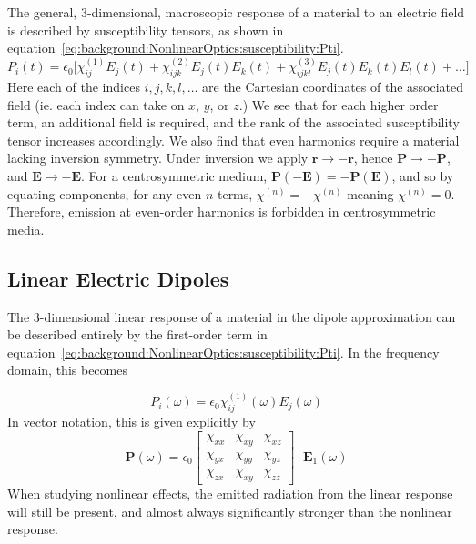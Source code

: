 The general, 3-dimensional, macroscopic response of a material to an electric field is described by susceptibility tensors, as shown in equation~\ref{eq:background:NonlinearOptics:susceptibility:Pti}.
\begin{equation}\label{eq:background:NonlinearOptics:susceptibility:Pti}
	P_{i}(t) =  \epsilon_{0}\big[
				\chi^{(1)}_{ij}  E_{j}(t) +
				\chi^{(2)}_{ijk}  E_{j}(t) E_{k}(t) +
				\chi^{(3)}_{ijkl}  E_{j}(t) E_{k}(t) E_{l}(t)+ \ldots
				\big]
\end{equation}
Here each of the indices $i,j,k,l,\ldots$ are the Cartesian coordinates of the associated field (ie. each index can take on $x$, $y$, or $z$.) We see that for each higher order term, an additional field is required, and the rank of the associated susceptibility tensor increases accordingly. We also find that even harmonics require a material lacking inversion symmetry. Under inversion we apply $\mathbf{r}\rightarrow -\mathbf{r}$, hence $\mathbf{P} \rightarrow -\mathbf{P}$, and $\mathbf{E} \rightarrow -\mathbf{E}$. For a centrosymmetric medium,  $\mathbf{P}(-\mathbf{E}) = -\mathbf{P}(\mathbf{E})$, and so by equating components, for any even $n$ terms, $\chi^{(n)}=-\chi^{(n)}$ meaning $\chi^{(n)} = 0$. Therefore, emission at even-order harmonics is forbidden in centrosymmetric media.

\subsection{Linear Electric Dipoles}\label{sec:background:NonlinearOptics:linearP}
The 3-dimensional linear response of a material in the dipole approximation can be described entirely by the first-order term in equation~\ref{eq:background:NonlinearOptics:susceptibility:Pti}. In the frequency domain, this becomes

\begin{equation}
	P_{i}(\omega) =  \epsilon_{0}
				\chi^{(1)}_{ij}(\omega)  E_{j}(\omega)
\end{equation}
In vector notation, this is given explicitly by
\begin{equation}
	\mathbf{P}(\omega) =  \epsilon_{0}
				\begin{bmatrix}
		\chi_{xx} & \chi_{xy} & \chi_{xz}\\ 
		\chi_{yx} & \chi_{yy} & \chi_{yz}\\ 
		\chi_{zx} & \chi_{xy} & \chi_{zz}
	\end{bmatrix} \cdot \mathbf{E}_{1}(\omega)
\end{equation}
When studying nonlinear effects, the emitted radiation from the linear response will still be present, and almost always significantly stronger than the nonlinear response.


